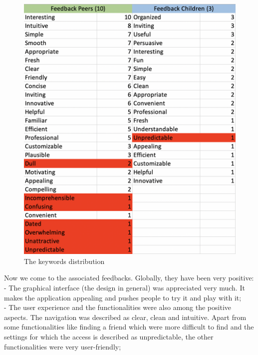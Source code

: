 \documentclass[12pt]{scrartcl}
\begin{document}
	\begin{figure}[H]
		\centering
		\includegraphics[width=\textwidth]{../images/gary_GA6_image_words_analysis.png}
		\caption{The keywords distribution}
		\label{words}
	\end{figure}
	
	\newpage

	Now we come to the associated feedbacks. Globally, they have been very positive:\\

		- The graphical interface (the design in general) was appreciated very much. It makes the application appealing and pushes people to try it and play with it;\\

		- The user experience and the functionalities were also among the positive aspects. The navigation was described as clear, clean and intuitive. Apart from some functionalities like finding a friend which were more difficult to find and the settings for which the access is described as unpredictable, the other functionalities were very user-friendly;\\
\end{document}
